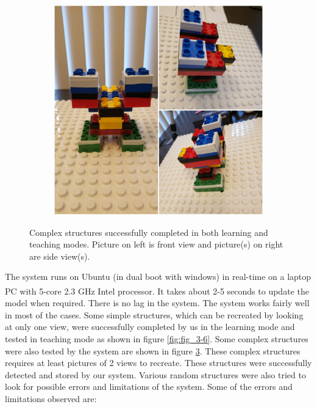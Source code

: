 \begin{figure}[H]
\begin{subfigure}{0.5\textwidth}
       \caption[{}]{\label{fig:fig_3-7d}}
    \end{subfigure}
    \begin{subfigure}{0.5\textwidth}
       \centering
       \includegraphics[width=0.8\linewidth]{figures/e7.jpg}
      
       \caption[{}]{ \label{fig:fig_3-7e}}
    \end{subfigure}
    \caption[{Complex 3D structures}]{Complex structures successfully completed in both learning and teaching modes. Picture on left is front view and picture(s) on right are side view(s).}
   \label{fig:fig_3-7}
\end{figure}
The system runs on Ubuntu (in dual boot with windows) in real-time on a laptop PC with 5-core 2.3 GHz Intel\textsuperscript\textregistered{} processor. It takes about 2-5 seconds to update the model when required. There is no lag in the system. The system works fairly well in most of the cases. Some simple structures, which can be recreated by looking at only one view, were successfully completed by us in the learning mode and tested in teaching mode as shown in figure \ref{fig:fig_3-6}. Some complex structures were also tested by the system are shown in figure \ref{fig:fig_3-7}. These complex structures requires at least pictures of 2 views to recreate. These structures were successfully detected and stored by our system. Various random structures were also tried to look for possible errors and limitations of the system. Some of the errors and limitations observed are:

